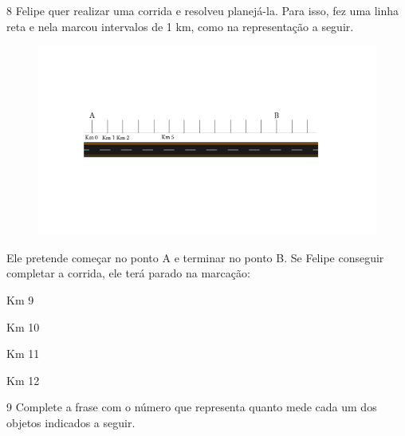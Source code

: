 \num{8} Felipe quer realizar uma corrida e resolveu planejá-la. Para isso,
fez uma linha reta e nela marcou intervalos de 1 km, como na representação a seguir.

\begin{figure}[htpb!]
\includegraphics[width=\textwidth]{../ilustracoes/MAT5/SAEB_5ANO_MAT_figura6.png}
\end{figure}

Ele pretende começar no ponto A e terminar no ponto B. Se Felipe
conseguir completar a corrida, ele terá parado na marcação:

\begin{escolha}
\item
  Km 9
\item
  Km 10
\item
  Km 11
\item
  Km 12
\end{escolha}


\num{9} Complete a frase com o número que representa quanto mede cada um
dos objetos indicados a seguir.

